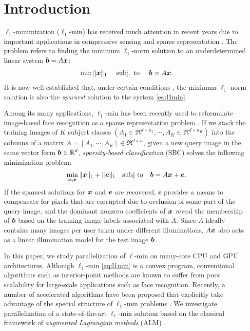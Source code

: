 \documentclass[10pt,twocolumn,letterpaper]{article}
\begin{document}
\section{Introduction} 
$\ell_1$-minimization ($\ell_1$-min) has received much attention in recent
years due to important applications in compressive sensing
\cite{BrucksteinA2007} and sparse representation \cite{WrightJ2010-PIEEE}.  
The problem refers to finding the minimum $\ell_1$-norm solution to an
underdetermined linear system ${\boldsymbol{b}}=A{\boldsymbol{x}}$:
\begin{equation}
\min \|{\boldsymbol{x}}\|_1\quad \mbox{ subj. to }\quad {\boldsymbol{b}} = A{\boldsymbol{x}}.
\label{eq:l1min}
\end{equation}
It is now well established that, under certain conditions
\cite{CandesE2005-IT_1,DonohoD2004}, the minimum $\ell_1$-norm solution is also
the \emph{sparsest} solution to the system \eqref{eq:l1min}.

Among its many applications, $\ell_1$-min has been recently used to reformulate
image-based face recognition as a sparse representation problem
\cite{WrightJ2009-PAMI}.  If we stack the training images of $K$ subject
classes $(A_1\in\Re^{d\times n_1}, \cdots, A_K\in\Re^{d\times n_K})$ into the
columns of a matrix $A = [A_1, \cdots, A_K]\in\Re^{d\times n}$, given a new
query image in the same vector form ${\boldsymbol{b}}\in{\mathbb{R}}^d$, \emph{sparsity-based
classification} (SBC) solves the following minimization problem:
\begin{equation}
\min_{{\boldsymbol{x}}, {\boldsymbol{e}}} \| {\boldsymbol{x}} \|_1 + \|{\boldsymbol{e}}\|_1 \quad \textup{subj to} \quad {\boldsymbol{b}} = A {\boldsymbol{x}} + {\boldsymbol{e}}.
\label{eq:l1min_denoise}
\end{equation}
If the sparsest solutions for ${\boldsymbol{x}}$ and $\boldsymbol{e}$ are recovered, $\ee$ provides a
means to compensate for pixels that are corrupted due to occlusion of some part of the query
image, and the dominant nonzero coefficients of ${\boldsymbol{x}}$ reveal the membership of
${\boldsymbol{b}}$ based on the training image labels associated with $A$.  Since $A$ ideally
contains many images per user taken under different illuminations, 
$A{\boldsymbol{x}}$ also acts as a linear illumination model for the test image ${\boldsymbol{b}}$.

In this paper, we study parallelization of $\ell$-min on many-core CPU and GPU
architectures. Although $\ell_1$-min \eqref{eq:l1min} is a convex
program, conventional algorithms such as interior-point methods
\cite{ChenS2001-SIAM,TibshiraniR1996} are known to suffer from poor scalability
for large-scale applications such as face recognition. Recently, a number of
accelerated algorithms have been proposed that explicitly take advantage of
the special structure of $\ell_1$-min problems
\cite{LorisI2009,YangA2010-ICIP}. We investigate parallelization of a
state-of-the-art $\ell_1$-min solution based on the classical framework of
\emph{augmented Lagrangian methods} (ALM) \cite{BertsekasD2003,YangA2010-ICIP}.
\end{document}
